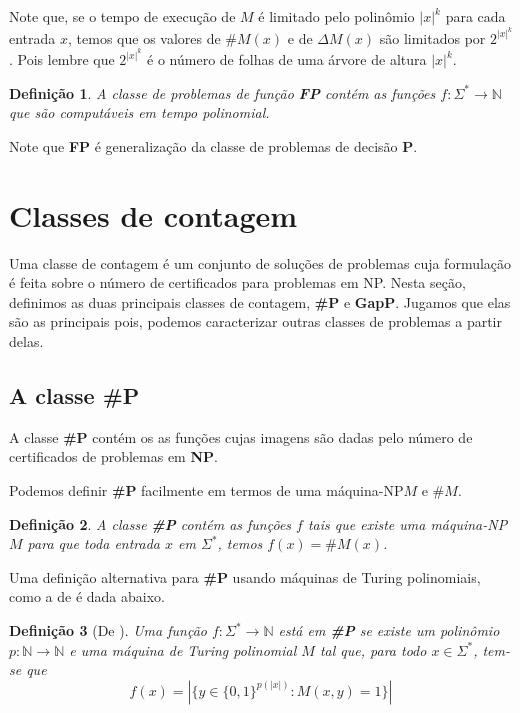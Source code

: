 \documentclass[paper=a4, fontsize=11pt]{scrartcl} %
\newtheorem{definition}{Definição}
\numberwithin{equation}{subsection}
\numberwithin{figure}{subsection}
\numberwithin{table}{subsection}
\numberwithin{definition}{subsection}
\numberwithin{theorem}{subsection}
\numberwithin{property}{subsection}
\numberwithin{proposition}{subsection}
\newcommand{\words}{$\Sigma^*$\xspace}
\newcommand{\mwords}{\Sigma^*\xspace}
\renewcommand{\P}{\textbf{P}\xspace}
\newcommand{\SP}{\textbf{\#P}\xspace}
\newcommand{\NP}{\textbf{NP}\xspace}
\newcommand{\FP}{\textbf{FP}\xspace}
\newcommand{\gP}{\textbf{GapP}\xspace}
\newcommand{\npmach}{máquina-NP\xspace}
\begin{document}
Note que, se o tempo de execução de $M$ é limitado pelo polinômio $|x|^k$ para cada entrada $x$, temos que os valores de $\#M(x)$ e de $\Delta M(x)$ são limitados por $2^{|x|^k}$. Pois lembre que $2^{|x|^k}$ é o número de folhas de uma árvore de altura $|x|^k$.

\begin{definition} A classe de problemas de função \FP contém as funções $f: \text{\words} \rightarrow \mathbb{N}$ que são computáveis em tempo polinomial.
\end{definition}

Note que \FP é generalização da classe de problemas de decisão \P.

\pagebreak
\section{Classes de contagem}

Uma classe de contagem é um conjunto de soluções de problemas cuja formulação é feita sobre o número de certificados para problemas em NP. Nesta seção, definimos as duas principais classes de contagem, \SP e \gP. Jugamos que elas são as principais pois, podemos caracterizar outras classes de problemas a partir delas.

\subsection{A classe \SP}

A classe \SP contém os as funções cujas imagens são dadas pelo número de certificados de problemas em \NP. %

Podemos definir \SP facilmente em termos de uma \npmach $M$ e $\#M$.
\begin{definition} A classe \SP contém as funções $f$ tais que existe uma \npmach $M$ para que toda entrada $x$ em $\mwords$, temos $f(x) = \#M(x)$.
\end{definition}

Uma definição alternativa para \SP usando máquinas de Turing polinomiais, como  a de \cite{Arora09} é dada abaixo.
\begin{definition}[De \cite{Arora09}] Uma função $f:\mwords \rightarrow \mathbb{N}$ está em \SP se existe um polinômio $p:\mathbb{N} \rightarrow \mathbb{N}$ e uma máquina de Turing polinomial $M$ tal que, para todo $x \in \mwords$, tem-se que
$$
f(x) = \left| \{ y \in \{0, 1\}^{p(|x|)}: M(x, y) = 1 \} \right|
$$
\end{definition}
\end{document}

